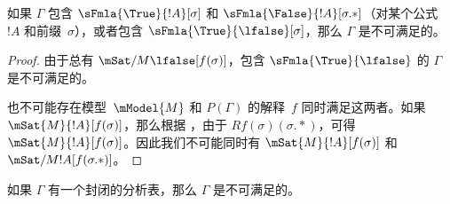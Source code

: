 \documentclass[../../../include/open-logic-section]{subfiles}
\begin{document}
\begin{prop}
  如果 $\Gamma$ 包含 $\sFmla{\True}{!A}[\sigma]$ 和 $\sFmla{\False}{!A}[\sigma.{*}]$（对某个公式~$!A$ 和前缀~$\sigma$），或者包含 $\sFmla{\True}{\lfalse}[\sigma]$，那么 $\Gamma$ 是不可满足的。
\end{prop}

\begin{proof}
  由于总有 $\mSat/{M}{\lfalse}[f(\sigma)]$，包含 $\sFmla{\True}{\lfalse}$ 的 $\Gamma$ 是不可满足的。

  也不可能存在模型~$\mModel{M}$ 和 $P(\Gamma)$ 的解释~$f$ 同时满足这两者。如果 $\mSat{M}{!A}[f(\sigma)]$，那么根据
  ，由于
  $Rf(\sigma)(\sigma.{*})$，可得 $\mSat{M}{!A}[f(\sigma)]$。因此我们不可能同时有 $\mSat{M}{!A}[f(\sigma)]$ 和
  $\mSat/{M}{!A}[f(\sigma.{*})]$。
\end{proof}

\begin{thm}[可靠性]
  如果 $\Gamma$ 有一个封闭的分析表，那么 $\Gamma$ 是不可满足的。
\end{thm}
\end{document}
